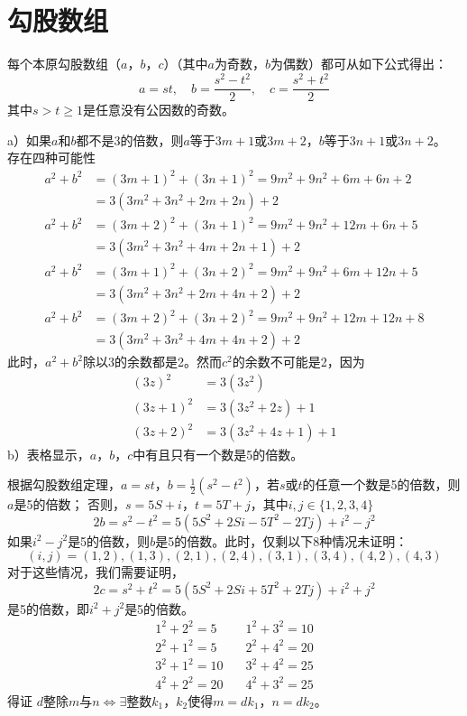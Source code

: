 \chapter{勾股数组}
\begin{theorem}[勾股数组定理]
每个本原勾股数组（$a$，$b$，$c$）（其中$a$为奇数，$b$为偶数）都可从如下公式得出：
\[a=st,\quad b=\frac{s^2-t^2}{2},\quad c=\frac{s^2+t^2}{2}\]
其中$s>t\ge1$是任意没有公因数的奇数。
\end{theorem}
%
\exercise
a）如果$a$和$b$都不是3的倍数，则$a$等于$3m+1$或$3m+2$，$b$等于$3n+1$或$3n+2$。
存在四种可能性
\begin{align*}
a^2+b^2&=(3m+1)^2+(3n+1)^2=9m^2+9n^2+6m+6n+2\\
&=3(3m^2+3n^2+2m+2n)+2\\
a^2+b^2&=(3m+2)^2+(3n+1)^2=9m^2+9n^2+12m+6n+5\\
&=3(3m^2+3n^2+4m+2n+1)+2\\
a^2+b^2&=(3m+1)^2+(3n+2)^2=9m^2+9n^2+6m+12n+5\\
&=3(3m^2+3n^2+2m+4n+2)+2\\
a^2+b^2&=(3m+2)^2+(3n+2)^2=9m^2+9n^2+12m+12n+8\\
&=3(3m^2+3n^2+4m+4n+2)+2
\end{align*}
此时，$a^2+b^2$除以3的余数都是2。然而$c^2$的余数不可能是2，因为
\begin{align*}
(3z)^2 &= 3(3z^2) \\
(3z + 1)^2 &= 3(3z^2 + 2z) + 1 \\
(3z + 2)^2 &= 3(3z^2 + 4z + 1) + 1 
\end{align*}
b）表格显示，$a$，$b$，$c$中有且只有一个数是5的倍数。\par
\proof 根据勾股数组定理，$a=st$，$b=\frac{1}{2}(s^2-t^2)$，若$s$或$t$的任意一个数是5的倍数，则$a$是5的倍数；
否则，$s=5S+i$，$t=5T+j$，其中$i, j \in \{1,2,3,4\}$
\[2b=s^2-t^2=5(5S^2 +2Si - 5T^2-2Tj)+i^2-j^2\]
如果$i^2-j^2$是5的倍数，则$b$是5的倍数。此时，仅剩以下8种情况未证明：
\[(i,j) = (1,2), (1,3), (2,1), (2,4), (3,1), (3,4), (4,2), (4,3)\]
对于这些情况，我们需要证明，\[2c=s^2+t^2=5(5S^2 +2Si + 5T^2+2Tj)+i^2+j^2\]
是5的倍数，即$i^2+j^2$是5的倍数。
\begin{align*}
    1^2+2^2=5 &\quad 1^2+3^2=10 \\
    2^2+1^2=5 &\quad 2^2+4^2=20 \\
    3^2+1^2=10 &\quad 3^2+4^2=25 \\
    4^2+2^2=20 &\quad 4^2+3^2=25 
\end{align*}
得证
%
\exercise\proof
$d$整除$m$与$n \Leftrightarrow 
\exists$整数$k_1$，$k_2$使得$m=dk_1$，$n=dk_2$。
